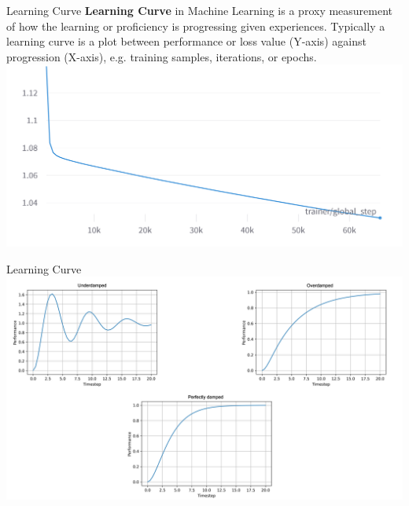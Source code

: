 \documentclass{beamer}
\begin{document}
\begin{frame}[fragile]{Learning Curve}
    \textbf{Learning Curve} in Machine Learning is a proxy measurement of how the learning or proficiency is progressing given experiences. Typically a learning curve is a plot between performance or loss value (Y-axis) against progression (X-axis), e.g. training samples, iterations, or epochs.
    \includegraphics[width=\textwidth,height=\textheight,keepaspectratio]{figures/Learning Curve Example.png}
\end{frame}
\begin{frame}[fragile]{Learning Curve}
    \includegraphics[width=\textwidth,height=\textheight,keepaspectratio]{figures/Dampness.png}
\end{frame}
\end{document}
